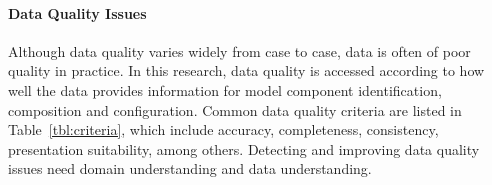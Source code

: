 

\paragraph{Data Quality Issues}

Although data quality varies widely from case to case, data is often of poor quality in practice. In this research, data quality is accessed according to how well the data provides information for model component identification, composition and configuration. 
Common data quality criteria are listed in Table~\ref{tbl:criteria}, which include accuracy, completeness, consistency, presentation suitability, %
among others. %
Detecting and improving data quality issues need domain understanding and data understanding. 
% 
